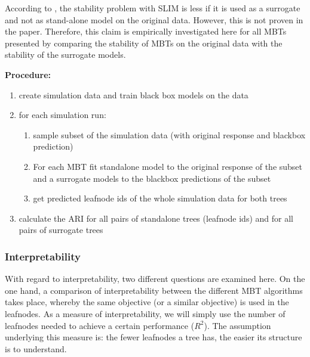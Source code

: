 According to \citep{Hu.2020}, the stability problem with SLIM is less if it is used as a surrogate and not as stand-alone model on the original data. However, this is not proven in the paper. Therefore, this claim is empirically investigated here for all MBTs presented by comparing the stability of MBTs on the original data with the stability of the surrogate models.


\vspace{0.5 cm}

\textbf{Procedure:} 
\begin{enumerate}
    \item create simulation data and train black box models on the data 
    \item for each simulation run:
    \begin{enumerate}
        \item sample subset of the simulation data (with original response and blackbox prediction)
        \item For each MBT fit standalone model to the original response of the subset and a surrogate models to the  blackbox predictions of the subset
        \item get predicted leafnode ids of the whole simulation data for both trees
    \end{enumerate}
    \item calculate the ARI for all pairs of standalone trees (leafnode ids) and for all pairs of surrogate trees
\end{enumerate}






\subsubsection{Interpretability}


With regard to interpretability, two different questions are examined here. On the one hand, a comparison of interpretability between the different MBT algorithms takes place, whereby the same objective (or a similar objective) is used in the leafnodes. As a measure of interpretability, we will simply use the number of leafnodes needed to achieve a certain performance ($R^2$).  The assumption underlying this measure is: the fewer leafnodes a tree has, the easier its structure is to understand.

